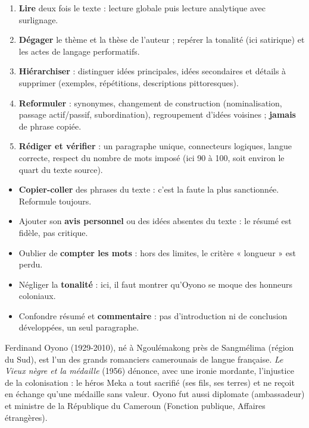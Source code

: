 \documentclass[11pt]{article}
\begin{document}
\begin{aretenir}
\begin{enumerate}
\item \textbf{Lire} deux fois le texte : lecture globale puis lecture analytique avec surlignage.
\item \textbf{Dégager} le thème et la thèse de l'auteur ; repérer la tonalité (ici satirique) et les actes de langage performatifs.
\item \textbf{Hiérarchiser} : distinguer idées principales, idées secondaires et détails à supprimer (exemples, répétitions, descriptions pittoresques).
\item \textbf{Reformuler} : synonymes, changement de construction (nominalisation, passage actif/passif, subordination), regroupement d'idées voisines ; \textbf{jamais} de phrase copiée.
\item \textbf{Rédiger et vérifier} : un paragraphe unique, connecteurs logiques, langue correcte, respect du nombre de mots imposé (ici 90 à 100, soit environ le quart du texte source).
\end{enumerate}
\end{aretenir}

\begin{attention}
\begin{itemize}
\item \textbf{Copier-coller} des phrases du texte : c'est la faute la plus sanctionnée. Reformule toujours.
\item Ajouter son \textbf{avis personnel} ou des idées absentes du texte : le résumé est fidèle, pas critique.
\item Oublier de \textbf{compter les mots} : hors des limites, le critère « longueur » est perdu.
\item Négliger la \textbf{tonalité} : ici, il faut montrer qu'Oyono se moque des honneurs coloniaux.
\item Confondre résumé et \textbf{commentaire} : pas d'introduction ni de conclusion développées, un seul paragraphe.
\end{itemize}
\end{attention}

\begin{savaistu}
Ferdinand Oyono (1929-2010), né à Ngoulémakong près de Sangmélima (région du Sud), est l'un des grands romanciers camerounais de langue française. \emph{Le Vieux nègre et la médaille} (1956) dénonce, avec une ironie mordante, l'injustice de la colonisation : le héros Meka a tout sacrifié (ses fils, ses terres) et ne reçoit en échange qu'une médaille sans valeur. Oyono fut aussi diplomate (ambassadeur) et ministre de la République du Cameroun (Fonction publique, Affaires étrangères).
\end{savaistu}
\end{document}
